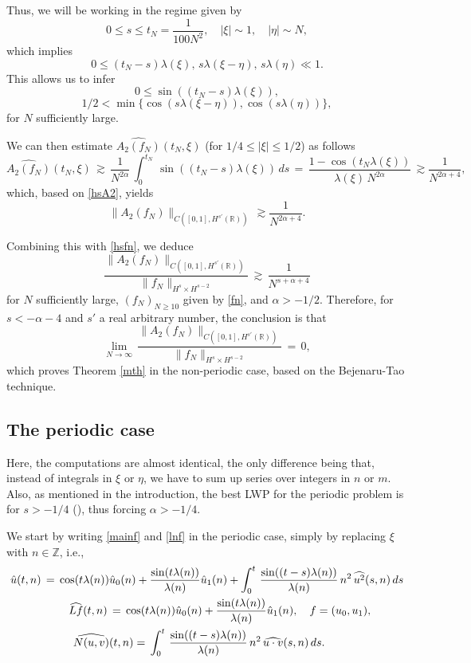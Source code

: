 \documentclass{amsart}
\begin{document}
Thus, we will be working in the regime given by
\[
0\leq s\leq t_N=\frac{1}{100 N^2}, \quad |\xi|\sim 1, \quad |\eta|\sim N,\]
which implies
\[
0 \leq (t_N-s) \lambda(\xi),\,s \lambda(\xi-\eta),\, s\lambda(\eta) \ll 1. \]
This allows us to infer
\[
0 \leq \sin ((t_N-s) \lambda(\xi)),
\]
\[
1/2 < \min\{\cos(s \lambda(\xi-\eta)), \cos(s\lambda(\eta))\},
\]
for $N$ sufficiently large. 

We can then estimate $\widehat{A_2(f_N)}(t_N,\xi)$ (for $1/4\leq |\xi| \leq 1/2$) as follows
\[
\widehat{A_2(f_N)}(t_N,\xi)\,\gtrsim\,\frac{1}{N^{2\alpha}}\,\int_0^{t_N}\, \sin((t_N-s) \lambda(\xi))\,ds\,=\,\frac{1-\cos(t_N \lambda(\xi))}{\lambda(\xi)\,N^{2\alpha}}\,\gtrsim \frac{1}{N^{2\alpha+4}},\]
which, based on \eqref{hsA2}, yields
\begin{equation}
\|A_2(f_N)\|_{C([0,1], H^{s'}(\mathbb{R}))}\,\gtrsim \frac{1}{N^{2\alpha+4}}.
\end{equation}

Combining this with \eqref{hsfn}, we deduce 
\begin{equation}
\frac{\|A_2(f_N)\|_{C([0,1], H^{s'}(\mathbb{R}))}}{\|f_N\|_{H^s \times H^{s -2}}}\,\gtrsim\, \frac{1}{N^{s+\alpha+4}}
\end{equation}
for $N$ sufficiently large, $(f_N)_{N\geq 10}$ given by \eqref{fn}, and $\alpha>-1/2$. Therefore, for $s<-\alpha-4$ and $s'$ a real arbitrary number, the conclusion is that
\begin{equation}
\lim_{N\to\infty}\,\frac{\|A_2(f_N)\|_{C([0,1], H^{s'}(\mathbb{R}))}}{\|f_N\|_{H^s \times H^{s -2}}}\,=\,0,
\end{equation}
which proves Theorem \ref{mth} in the non-periodic case, based on the Bejenaru-Tao technique.

\subsection{The periodic case} Here, the computations are almost identical, the only difference being that, instead of integrals in $\xi$ or $\eta$, we have to sum up series over integers in $n$ or $m$. Also, as mentioned in the introduction, the best LWP for the periodic problem is for $s>-1/4$ (\cite{Farah:2010ys}), thus forcing $\alpha>-1/4$. 

We start by writing \eqref{mainf} and \eqref{lnf} in the periodic case, simply by replacing $\xi$ with $n\in\mathbb{Z}$, i.e.,
\begin{equation}
\aligned
\hat{u}(t,n)\,=\,\cos(t \lambda(n))& \hat{u}_0(n)+\frac{\sin(t \lambda(n))}{\lambda(n)} \hat{u}_1(n)+\int_0^t\,\frac{\sin((t-s) \lambda(n))}{\lambda(n)}\, n^2\, \widehat{u^2}(s,n)\,ds\\
\widehat{Lf}(t,n)\,&=\,\cos(t \lambda(n)) \hat{u}_0(n)+\frac{\sin(t \lambda(n))}{\lambda(n)} \hat{u}_1(n),\quad f=(u_0,u_1),\\
\widehat{N(u,v)}&(t,n)=\,\int_0^t\,\frac{\sin((t-s) \lambda(n))}{\lambda(n)}\, n^2\, \widehat{u\cdot v}(s,n)\,ds.\endaligned
\end{equation}
\end{document}
